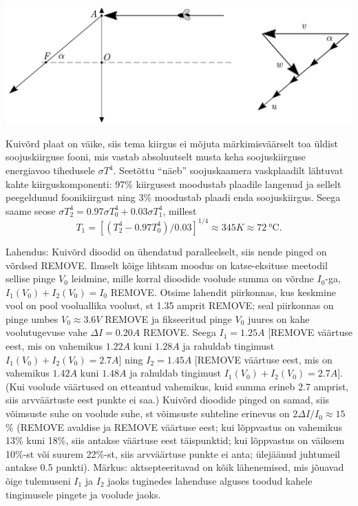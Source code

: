 \documentclass[10pt]{article}
\newcommand{\pp}[1]{REMOVE}
\begin{document}
\begin{center}
\includegraphics[scale=0.7]{2019-v3g-08-yl.pdf}
\end{center}
\probend
\bigskip


\solu
Kuivõrd plaat on väike, siis tema kiirgus ei mõjuta märkimisväärselt toa üldist soojuskiirguse fooni, mis vastab absoluutselt musta keha soojuskiirguse energiavoo tihedusele $\sigma T^4$. Seetõttu ``näeb'' soojuskaamera vaskplaadilt lähtuvat kahte kiirguskomponenti: 97\% kiirgusest moodustab plaadile langenud ja sellelt peegeldunud foonikiirgust ning 3\% moodustab plaadi enda soojuskiirgus. Seega saame seose $\sigma T_2^4= \num{0.97}\sigma T_0^4+\num{0.03}\sigma T_1^4$, millest 
$$T_1=[(T_2^4-\num{0.97}T_0^4)/\num{0.03}]^{1/4}\approx \SI {345}K\approx \SI{72}\celsius.$$
\probend
\bigskip

\setAuthor{}

\solu
Lahendus: Kuivõrd dioodid on ühendatud paralleelselt, siis nende pinged on võrdsed  \pp{2}. Ilmselt kõige lihtsam moodus on katse-eksituse meetodil sellise pinge $V_0$ leidmine, mille korral dioodide voolude summa on võrdne $I_0$-ga, $I_1(V_0)+I_2(V_0)=I_0$  \pp{2}. Otsime lahendit piirkonnas, kus keskmine vool on pool vooluallika voolust, st 1.35 amprit  \pp{1}; seal piirkonnas on pinge umbes $V_0\approx \SI{3.6}V$ \pp{1} ja fikseeritud pinge $V_0$ juures on kahe voolutugevuse vahe $\Delta I = \SI {0.20}A$  \pp{1}. Seega $I_1=\SI{1.25}A$ [\pp{0.5} väärtuse eest, mis on vahemikus $\SI{1.22}A$ kuni $\SI{1.28}A$  ja rahuldab tingimust $I_1(V_0)+I_2(V_0)=\SI{2.7}A$] ning $I_2=\SI{1.45}A$ [\pp{0.5} väärtuse eest, mis on vahemikus $\SI{1.42}A$ kuni $\SI{1.48}A$ ja rahuldab tingimust $I_1(V_0)+I_2(V_0)=\SI{2.7}A$]. (Kui voolude väärtused on etteantud vahemikus, kuid summa erineb 2.7 amprist, siis arvväärtuste eest punkte ei saa.) Kuivõrd dioodide pinged on samad, siis võimsuste suhe on voolude suhe, st võimsuste suhteline erinevus on $2\Delta I/I_0\approx 15$\%  (\pp{1} avaldise ja \pp{1} väärtuse eest; kui lõppvastus on vahemikus 13\% kuni 18\%, siis antakse väärtuse eest täispunktid; kui lõppvastus on väiksem 10\%-st või suurem 22\%-st, siis arvväärtuse punkte ei anta; ülejäänud juhtumeil antakse 0.5 punkti). Märkus: aktsepteeritavad on kõik lähenemised, mis jõuavad õige tulemuseni $I_1$ ja $I_2$ jaoks tuginedes lahenduse alguses toodud kahele tingimusele pingete ja voolude jaoks.
\end{document}
